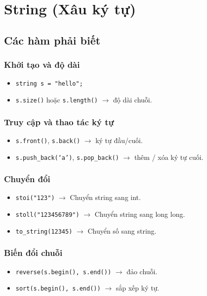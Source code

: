 \chapter{String (Xâu ký tự)}


\minitoc

\section{Các hàm phải biết}

\subsection{Khởi tạo và độ dài}
\begin{itemize}
    \item \texttt{string s = "hello";}
    \item \texttt{s.size()} hoặc \texttt{s.length()} $\to$ độ dài chuỗi.
\end{itemize}

\subsection{Truy cập và thao tác ký tự}
\begin{itemize}
    \item \texttt{s.front()}, \texttt{s.back()} $\to$ ký tự đầu/cuối.
    \item \texttt{s.push\_back(`a')}, \texttt{s.pop\_back()} $\to$ thêm / xóa ký tự cuối.
\end{itemize}

\subsection{Chuyển đổi}
\begin{itemize}
    \item \texttt{stoi("123")} $\to$ Chuyển string sang int.
    \item \texttt{stoll("123456789")} $\to$ Chuyển string sang long long.
    \item \texttt{to\_string(12345)} $\to$ Chuyển số sang string.
\end{itemize}

\subsection{Biến đổi chuỗi}
\begin{itemize}
    \item \texttt{reverse(s.begin(), s.end())} $\to$ đảo chuỗi.
    \item \texttt{sort(s.begin(), s.end())} $\to$ sắp xếp ký tự.
\end{itemize}

